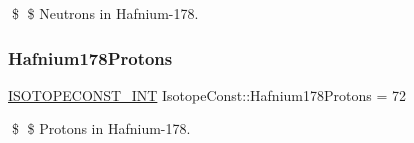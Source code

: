 \$ \$ Neutrons in Hafnium-\/178. \mbox{\label{group___isotope_const-_hafnium-_hf178_gaa981bf84e9d7c5597d189cee7db40af5}} 
\subsubsection{\texorpdfstring{Hafnium178\+Protons}{Hafnium178Protons}}
{\footnotesize\ttfamily \mbox{\hyperlink{group___isotope_const-_macros_ga5f18360b3e99483a35c32d789e62621c}{I\+S\+O\+T\+O\+P\+E\+C\+O\+N\+S\+T\+\_\+\+I\+NT}} Isotope\+Const\+::\+Hafnium178\+Protons = 72}

\$ \$ Protons in Hafnium-\/178. 